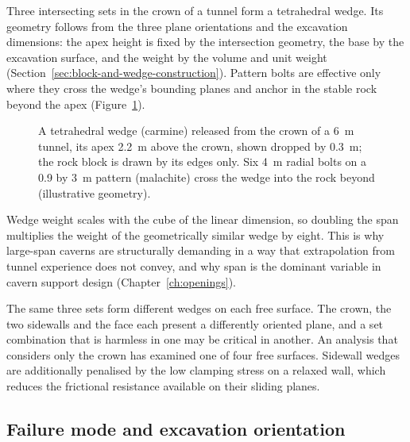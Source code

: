 Three intersecting sets in the crown of a tunnel form a tetrahedral wedge.
Its geometry follows from the three plane orientations and the excavation
dimensions: the apex height is fixed by the intersection geometry, the base by
the excavation surface, and the weight by the volume and unit weight (Section~\ref{sec:block-and-wedge-construction}).
Pattern bolts are effective only where they cross the wedge's bounding planes
and anchor in the stable rock beyond the apex (Figure~\ref{fig:r3d-crown-wedge}).

\begin{figure}[htbp]
\centering
{}
\caption{A tetrahedral wedge (carmine) released from the crown of a 6~m tunnel, its apex 2.2~m above the crown, shown dropped by 0.3~m; the rock block is drawn by its edges only. Six 4~m radial bolts on a 0.9 by 3~m pattern (malachite) cross the wedge into the rock beyond (illustrative geometry).}
\label{fig:r3d-crown-wedge}
\end{figure}

Wedge weight scales with the cube of the linear dimension, so doubling the
span multiplies the weight of the geometrically similar wedge by eight. This
is why large-span caverns are structurally demanding in a way that
extrapolation from tunnel experience does not convey, and why span is the
dominant variable in cavern support design
(Chapter~\ref{ch:openings}).

The same three sets form different wedges on each free surface. The crown, the
two sidewalls and the face each present a differently oriented plane, and a set
combination that is harmless in one may be critical in another. An analysis
that considers only the crown has examined one of four free surfaces. Sidewall
wedges are additionally penalised by the low clamping stress on a relaxed
wall, which reduces the frictional resistance available on their sliding
planes.

\subsection{Failure mode and excavation orientation}
\label{sec:mode-and-orientation}

